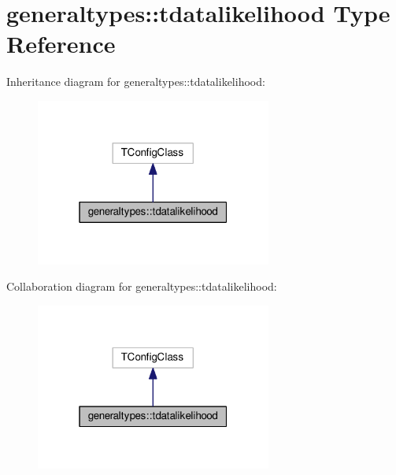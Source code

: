 \hypertarget{structgeneraltypes_1_1tdatalikelihood}{}\section{generaltypes\+:\+:tdatalikelihood Type Reference}
\label{structgeneraltypes_1_1tdatalikelihood}


Inheritance diagram for generaltypes\+:\+:tdatalikelihood\+:
\nopagebreak
\begin{figure}[H]
\begin{center}
\leavevmode
\includegraphics[width=220pt]{structgeneraltypes_1_1tdatalikelihood__inherit__graph}
\end{center}
\end{figure}


Collaboration diagram for generaltypes\+:\+:tdatalikelihood\+:
\nopagebreak
\begin{figure}[H]
\begin{center}
\leavevmode
\includegraphics[width=220pt]{structgeneraltypes_1_1tdatalikelihood__coll__graph}
\end{center}
\end{figure}
